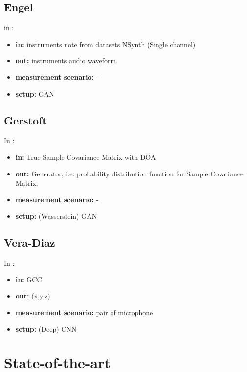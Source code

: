 \documentclass{article}
\begin{document}
\subsection{Engel}

in \cite{engel2019gansynth}:

\begin{itemize}
    \item \textbf{in:} instruments note from datasets NSynth (Single channel)
    \item \textbf{out:} instruments audio waveform.
    \item \textbf{measurement scenario:} - 
    \item \textbf{setup:} GAN
\end{itemize}

\subsection{Gerstoft}

In \cite{gerstoft2020parametric}:

\begin{itemize}
    \item \textbf{in:} True Sample Covariance Matrix with DOA
    \item \textbf{out:} Generator, i.e. probability distribution function for Sample Covariance Matrix.
    \item \textbf{measurement scenario:} -
    \item \textbf{setup:} (Wasserstein) GAN
\end{itemize}

\subsection{Vera-Diaz}

In \cite{vera2021acoustic}:

\begin{itemize}
    \item \textbf{in:} GCC
    \item \textbf{out:} (x,y,z)
    \item \textbf{measurement scenario:} pair of microphone
    \item \textbf{setup:} (Deep) CNN
\end{itemize}



\section{State-of-the-art}
\end{document}
